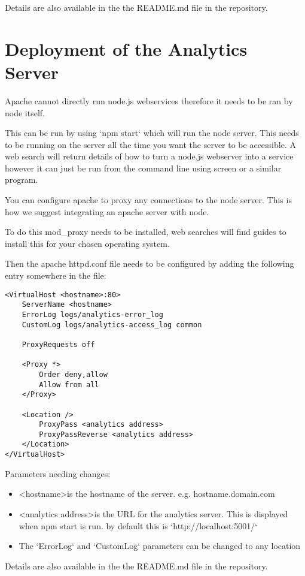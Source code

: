 Details are also available in the the README.md file in the repository.

\chapter{Deployment of the Analytics Server} \label{Chapter:Deployment Analytics Server}

Apache cannot directly run node.js webservices therefore it needs to be ran by node itself.

This can be run by using `npm start` which will run the node server. This needs to be running on the server all the time you want the server to be accessible.
A web search will return details of how to turn a node.js webserver into a service however it can just be run from the command line using screen or a similar program.

You can configure apache to proxy any connections to the node server. This is how we suggest integrating an apache server with node.

To do this mod\_proxy needs to be installed, web searches will find guides to install this for your chosen operating system.

Then the apache httpd.conf file needs to be configured by adding the following entry somewhere in the file:

\begin{lstlisting}[caption={\label{code:apacheConfig2} Apache configuration}]
<VirtualHost <hostname>:80>
	ServerName <hostname>
	ErrorLog logs/analytics-error_log
	CustomLog logs/analytics-access_log common

	ProxyRequests off
	
	<Proxy *>
		Order deny,allow
		Allow from all
	</Proxy>

	<Location />
		ProxyPass <analytics address>
		ProxyPassReverse <analytics address>
	</Location>
</VirtualHost>
\end{lstlisting}

Parameters needing changes:

\begin{itemize}
\item \textless hostname\textgreater is the hostname of the server. e.g. hostname.domain.com
\item \textless analytics address\textgreater is the URL for the analytics server. This is displayed when npm start is run. by default this is `http://localhost:5001/`
\item The `ErrorLog` and `CustomLog` parameters can be changed to any location
\end{itemize}

Details are also available in the the README.md file in the repository.